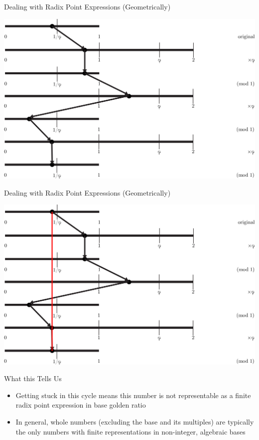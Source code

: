 \documentclass{beamer}
\begin{document}
\begin{frame}{Dealing with Radix Point Expressions (Geometrically)}
  \addtocounter{framenumber}{-1}
  \begin{example}
    \includegraphics[width=\textwidth,height=0.75\textheight]{images/Phinary/7}
  \end{example}
\end{frame}

\begin{frame}{Dealing with Radix Point Expressions (Geometrically)}
  \addtocounter{framenumber}{-1}
  \begin{example}
    \includegraphics[width=\textwidth,height=0.75\textheight]{images/Phinary/8}
  \end{example}
\end{frame}

\begin{frame}{What this Tells Us}
  \begin{itemize}
    \item Getting stuck in this cycle means this number is not representable as a finite radix point expression in base golden ratio \pause
    \item In general, whole numbers (excluding the base and its multiples) are typically the only numbers with finite representations in non-integer, algebraic bases
  \end{itemize}
\end{frame}
\end{document}

